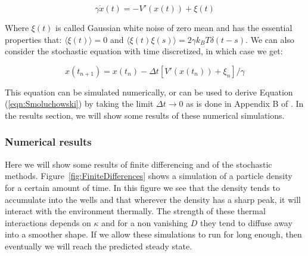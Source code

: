 \documentclass[11pt]{article} %
\begin{document}
\begin{equation}
\gamma \dot{x}(t) = -V'(x(t)) + \xi(t)
\end{equation}

Where $\xi(t)$ is called Gaussian white noise of zero mean and has the essential properties that: $\langle \xi(t) \rangle = 0$ and $\langle \xi(t) \xi(s) \rangle = 2 \gamma k_B T \delta(t - s) $. We can also consider the stochastic equation with time discretized, in which case we get:

\begin{equation}
x(t_{n+1}) = x(t_n) - \Delta t [V'(x(t_n)) + \xi_n]/\gamma
\end{equation}

This equation can be simulated numerically, or can be used to derive Equation (\ref{eqn:Smoluchowski}) by taking the limit $\Delta t \to 0$ as is done in Appendix B of \cite{Reimann2001}. In the results section, we will show some results of these numerical simulations.

\subsubsection{Numerical results}
Here we will show some results of finite differencing and of the stochastic methods. Figure~\ref{fig:FiniteDifferences} shows a simulation of a particle density for a certain amount of time. In this figure we see that the density tends to accumulate into the wells and that wherever the density has a sharp peak, it will interact with the environment thermally. The strength of these thermal interactions depends on $\kappa$ and for a non vanishing $D$ they tend to diffuse away into a smoother shape. If we allow these simulations to run for long enough, then eventually we will reach the predicted steady state.
\end{document}
